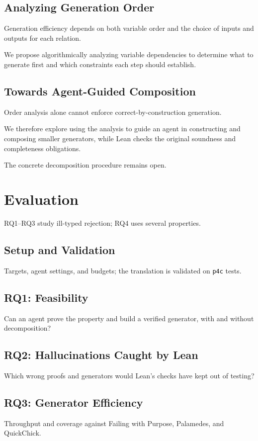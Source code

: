 \documentclass[11pt,a4paper]{article}
\newcommand{\desc}[1]{{\small #1\par}}
\begin{document}
\subsection{Analyzing Generation Order}
\desc{Generation efficiency depends on both variable order and the choice of inputs and outputs for each relation.}
\desc{We propose algorithmically analyzing variable dependencies to determine what to generate first and which constraints each step should establish.}
\subsection{Towards Agent-Guided Composition}
\desc{Order analysis alone cannot enforce correct-by-construction generation.}
\desc{We therefore explore using the analysis to guide an agent in constructing and composing smaller generators, while Lean checks the original soundness and completeness obligations.}
\desc{The concrete decomposition procedure remains open.}

\section{Evaluation}
\desc{RQ1--RQ3 study ill-typed rejection; RQ4 uses several properties.}

\subsection{Setup and Validation}
\desc{Targets, agent settings, and budgets; the translation is validated on \texttt{p4c} tests.}

\subsection{RQ1: Feasibility}
\desc{Can an agent prove the property and build a verified generator, with and without decomposition?}

\subsection{RQ2: Hallucinations Caught by Lean}
\desc{Which wrong proofs and generators would Lean's checks have kept out of testing?}

\subsection{RQ3: Generator Efficiency}
\desc{Throughput and coverage against Failing with Purpose, Palamedes, and QuickChick.}
\end{document}
